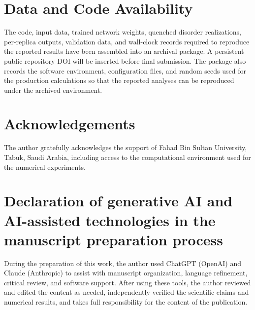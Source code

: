 \documentclass[a4paper,fleqn]{cas-sc}
\begin{document}
\section*{Data and Code Availability}
The code, input data, trained network weights, quenched disorder realizations, per-replica
outputs, validation data, and wall-clock records required to reproduce the reported results have
been assembled into an archival package. A persistent public repository DOI will be inserted
before final submission. The package also records the software environment, configuration files,
and random seeds used for the production calculations so that the reported analyses can be
reproduced under the archived environment.

\section*{Acknowledgements}
The author gratefully acknowledges the support of Fahad Bin Sultan University, Tabuk, Saudi
Arabia, including access to the computational environment used for the numerical experiments.

\printcredits


\section*{Declaration of generative AI and AI-assisted technologies in the manuscript preparation process}
During the preparation of this work, the author used ChatGPT (OpenAI) and Claude (Anthropic)
to assist with manuscript organization, language refinement, critical review, and software
support. After using these tools, the author reviewed and edited the content as needed,
independently verified the scientific claims and numerical results, and takes full
responsibility for the content of the publication.
\end{document}
